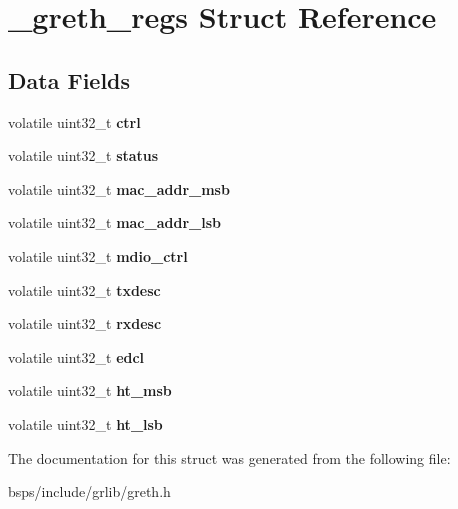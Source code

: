 \hypertarget{struct__greth__regs}{}\section{\+\_\+greth\+\_\+regs Struct Reference}
\label{struct__greth__regs}
\subsection*{Data Fields}
\begin{DoxyCompactItemize}
\item 
\mbox{\label{struct__greth__regs_a247b368a3d790b1e9a0eed9b7a7687be}} 
volatile uint32\+\_\+t {\bfseries ctrl}
\item 
\mbox{\label{struct__greth__regs_a58a0b730e705fb37a70560852d25eb1e}} 
volatile uint32\+\_\+t {\bfseries status}
\item 
\mbox{\label{struct__greth__regs_a17ffa859e93d7e146302eb1d87dfd052}} 
volatile uint32\+\_\+t {\bfseries mac\+\_\+addr\+\_\+msb}
\item 
\mbox{\label{struct__greth__regs_a60242411752de1e5ece9b875745a4a4e}} 
volatile uint32\+\_\+t {\bfseries mac\+\_\+addr\+\_\+lsb}
\item 
\mbox{\label{struct__greth__regs_a62441fd9286cfd3a3d11e64e17bf0a68}} 
volatile uint32\+\_\+t {\bfseries mdio\+\_\+ctrl}
\item 
\mbox{\label{struct__greth__regs_a72e01857954f90cd94b35ff5104204f2}} 
volatile uint32\+\_\+t {\bfseries txdesc}
\item 
\mbox{\label{struct__greth__regs_a38ba09ba449e23d1f357ae40cd6611f8}} 
volatile uint32\+\_\+t {\bfseries rxdesc}
\item 
\mbox{\label{struct__greth__regs_a7fbb1e90bb825f861357803660c97950}} 
volatile uint32\+\_\+t {\bfseries edcl}
\item 
\mbox{\label{struct__greth__regs_ab18166d87025346cf7f6bf03f8243e13}} 
volatile uint32\+\_\+t {\bfseries ht\+\_\+msb}
\item 
\mbox{\label{struct__greth__regs_a9ec123871af8131ddff75015f3c883a8}} 
volatile uint32\+\_\+t {\bfseries ht\+\_\+lsb}
\end{DoxyCompactItemize}


The documentation for this struct was generated from the following file\+:\begin{DoxyCompactItemize}
\item 
bsps/include/grlib/greth.\+h\end{DoxyCompactItemize}
